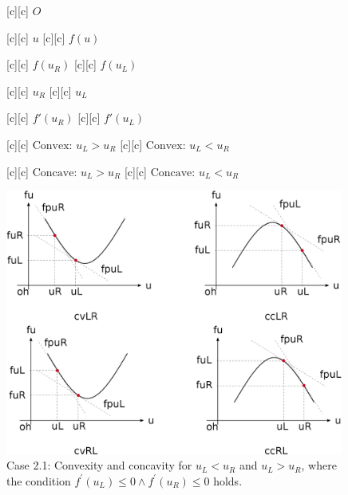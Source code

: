\begin{figure}[ht]
	\centering
	\footnotesize

	[c] {$O$}

	[c] {$u$}
	[c] {$f(u)$}

	[c] {$f(u_{R})$}
	[c] {$f(u_{L})$}

	[c] {$u_{R}$}
	[c] {$u_{L}$}

	[c] {$f'(u_{R})$}
	[c] {$f'(u_{L})$}

	[c] {$\text{Convex: } u_{L} > u_{R}$}
	[c] {$\text{Convex: } u_{L} < u_{R}$}

	[c] {$\text{Concave: } u_{L} > u_{R}$}
	[c] {$\text{Concave: } u_{L} < u_{R}$}

	\includegraphics[width=0.99\textwidth]{convexityfu_case21.eps}
	\caption{Case 2.1:
		Convexity and concavity for $u_{L} < u_{R}$ and $u_{L} > u_{R}$,
		where the condition $f^\prime(u_L) \leq 0 \wedge f^\prime(u_R) \leq 0$ holds.}
	\label{\LABEL}
\end{figure}